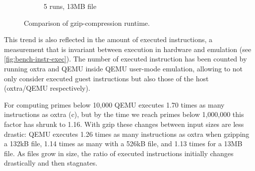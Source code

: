 \begin{figure}[H]
\begin{subfigure}[b]{1.0\textwidth}
		\caption{5 runs, 13MB file}
		\label{fig:bench-gzip-13mb}
	\end{subfigure}
	\caption[Gzip Benchmarking]{Comparison of gzip-compression runtime.}
	\label{fig:bench-gzip}
\end{figure}

This trend is also reflected in the amount of executed instructions, a measurement that is invariant between execution in hardware and emulation (see \autoref{fig:bench-instr-exec}). The number of executed instruction has been counted by running oxtra and QEMU inside QEMU user-mode emulation, allowing to not only consider executed guest instructions but also those of the host (oxtra/QEMU respectively).

For computing primes below 10,000 QEMU executes 1.70 times as many instructions as oxtra (c), but by the time we reach primes below 1,000,000 this factor has shrunk to 1.16. With gzip these changes between input sizes are less drastic: QEMU executes 1.26 times as many instructions as oxtra when gzipping a 132kB file, 1.14 times as many with a 526kB file, and 1.13 times for a 13MB file. As files grow in size, the ratio of executed instructions initially changes drastically and then stagnates.

